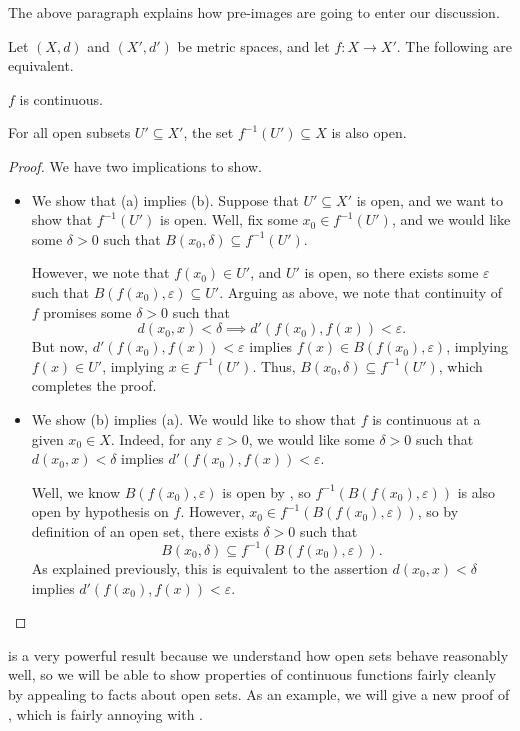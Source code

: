 \documentclass[../main.tex]{subfiles}
\begin{document}
The above paragraph explains how pre-images are going to enter our discussion.
\begin{theorem} \label{thm:cont-by-opens}
    Let $(X,d)$ and $(X',d')$ be metric spaces, and let $f\colon X\to X'$. The following are equivalent.
    \begin{listalph}
        \item $f$ is continuous.
        \item For all open subsets $U'\subseteq X'$, the set $f^{-1}(U')\subseteq X$ is also open.
    \end{listalph}
\end{theorem}
\begin{proof}
    We have two implications to show.
    \begin{itemize}
        \item We show that (a) implies (b). Suppose that $U'\subseteq X'$ is open, and we want to show that $f^{-1}(U')$ is open. Well, fix some $x_0\in f^{-1}(U')$, and we would like some $\delta>0$ such that $B(x_0,\delta)\subseteq f^{-1}(U')$.

        However, we note that $f(x_0)\in U'$, and $U'$ is open, so there exists some $\varepsilon$ such that $B(f(x_0),\varepsilon)\subseteq U'$. Arguing as above, we note that continuity of $f$ promises some $\delta>0$ such that
        \[d(x_0,x)<\delta\implies d'(f(x_0),f(x))<\varepsilon.\]
        But now, $d'(f(x_0),f(x))<\varepsilon$ implies $f(x)\in B(f(x_0),\varepsilon)$, implying $f(x)\in U'$, implying $x\in f^{-1}(U')$. Thus, $B(x_0,\delta)\subseteq f^{-1}(U')$, which completes the proof.

        \item We show (b) implies (a). We would like to show that $f$ is continuous at a given $x_0\in X$. Indeed, for any $\varepsilon>0$, we would like some $\delta>0$ such that $d(x_0,x)<\delta$ implies $d'(f(x_0),f(x))<\varepsilon$.

        Well, we know $B(f(x_0),\varepsilon)$ is open by , so $f^{-1}(B(f(x_0),\varepsilon))$ is also open by hypothesis on $f$. However, $x_0\in f^{-1}(B(f(x_0),\varepsilon))$, so by definition of an open set, there exists $\delta>0$ such that
        \[B(x_0,\delta)\subseteq f^{-1}(B(f(x_0),\varepsilon)).\]
        As explained previously, this is equivalent to the assertion $d(x_0,x)<\delta$ implies $d'(f(x_0),f(x))<\varepsilon$.
        \qedhere
    \end{itemize}
\end{proof}
 is a very powerful result because we understand how open sets behave reasonably well, so we will be able to show properties of continuous functions fairly cleanly by appealing to facts about open sets. As an example, we will give a new proof of , which is fairly annoying with .
\end{document}
